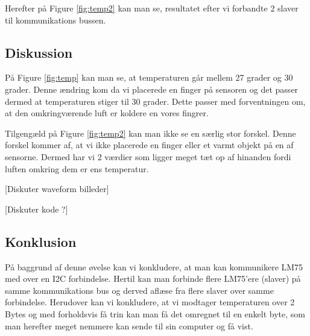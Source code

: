 \documentclass[../main.tex]{subfiles}
\begin{document}
Herefter på Figure \ref{fig:temp2} kan man se, resultatet efter vi forbandte 2 slaver til kommunikations bussen.



\subsection{Diskussion}
På Figure \ref{fig:temp} kan man se, at temperaturen går mellem 27 grader og 30 grader. Denne ændring kom da vi placerede en finger på sensoren og det passer dermed at temperaturen stiger til 30 grader.
Dette passer med forventningen om, at den omkringværende luft er koldere en vores fingrer.

Tilgengæld på Figure \ref{fig:temp2} kan man ikke se en særlig stor forskel. Denne forskel kommer af, at vi ikke placerede en finger eller et varmt objekt på en af sensorne. 
Dermed har vi 2 værdier som ligger meget tæt op af hinanden fordi luften omkring dem er ens temperatur.

[Diskuter waveform billeder]

[Diskuter kode ?]
\subsection{Konklusion}
På baggrund af denne øvelse kan vi konkludere, at man kan kommunikere LM75 med over en I2C forbindelse. Hertil kan man forbinde flere LM75'ere (slaver) på samme kommunikations bus og derved aflæse fra flere slaver over samme forbindelse.
Herudover kan vi konkludere, at vi modtager temperaturen over 2 Bytes og med forholdsvis få trin kan man få det omregnet til en enkelt byte, som man herefter meget nemmere kan sende til sin computer og få vist. 
\end{document}
